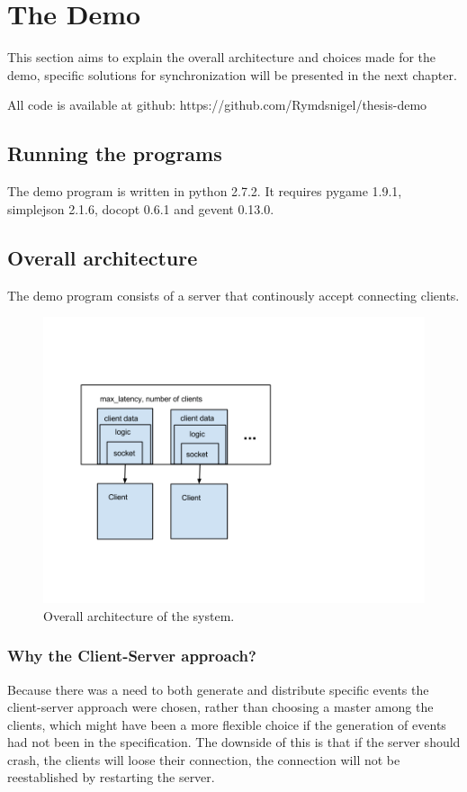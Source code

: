 \chapter{The Demo}

This section aims to explain the overall architecture and choices made for the demo, specific solutions for synchronization will be presented in the next chapter. 

All code is available at github: https://github.com/Rymdsnigel/thesis-demo

\section{Running the programs}
The demo program is written in python 2.7.2. It requires pygame 1.9.1, simplejson 2.1.6, docopt 0.6.1 and gevent 0.13.0. 


\section{Overall architecture}
The demo program consists of a server that continously accept connecting clients. 

\begin{figure}[h!]
\centering
\includegraphics[width=1.0\textwidth]{figures/arch.png}
\caption{Overall architecture of the system.}
\end{figure}

\subsection{Why the Client-Server approach?}
Because there was a need to both generate and distribute specific events the client-server approach were chosen, rather than choosing a master among the clients, which might have been a more flexible choice if the generation of events had not been in the specification. The downside of this is that if the server should crash, the clients will loose their connection, the connection will not be reestablished by restarting the server.

